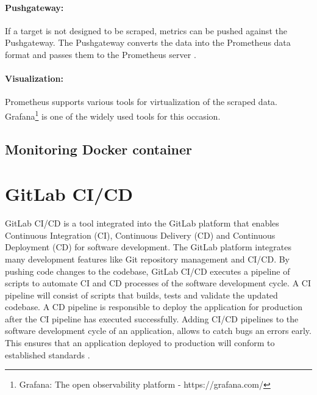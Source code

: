 \paragraph{Pushgateway:}
If a target is not designed to be scraped, metrics can be pushed against the Pushgateway\cite{Prom2020Docs}. The Pushgateway converts the data into the Prometheus data format and passes them to the Prometheus server \cite{Pandey2020Monitoring}.


\paragraph{Visualization:}
Prometheus supports various tools for virtualization of the scraped data. Grafana\footnote{Grafana: The open observability platform - https://grafana.com/} is one of the widely used tools for this occasion.




\subsection{Monitoring Docker container}


\section{GitLab CI/CD}
GitLab CI/CD is a tool integrated into the GitLab platform that enables Continuous Integration (CI), Continuous Delivery (CD) and Continuous Deployment (CD) for software development.
The GitLab platform integrates many development features like Git repository management and CI/CD.
By pushing code changes to the codebase, GitLab CI/CD executes a pipeline of scripts to automate CI and CD processes of the software development cycle.
A CI pipeline will consist of scripts that builds, tests and validate the updated codebase.
A CD pipeline is responsible to deploy the application for production after the CI pipeline has executed successfully.
Adding CI/CD pipelines to the software development cycle of an application, allows to catch bugs an errors early. This ensures that an application deployed to production will conform to established standards \cite{Gitlab2020Docs}.


